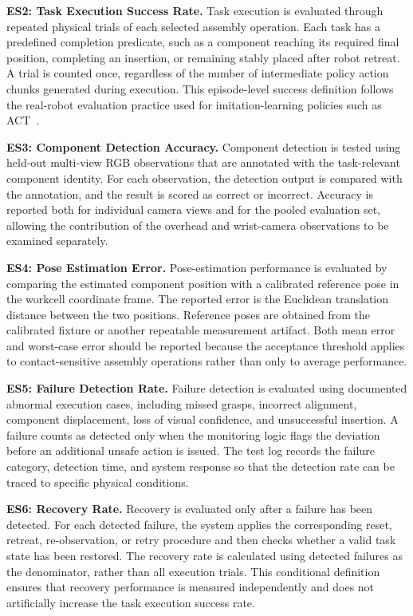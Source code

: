 \documentclass[12pt, letterpaper]{article}
\begin{document}
  \noindent\textbf{ES2: Task Execution Success Rate.}
  Task execution is evaluated through repeated physical trials of each selected
  assembly operation. Each task has a predefined completion predicate, such as a
  component reaching its required final position, completing an insertion, or
  remaining stably placed after robot retreat. A trial is counted once, regardless
  of the number of intermediate policy action chunks generated during execution.
  This episode-level success definition follows the real-robot evaluation
  practice used for imitation-learning policies such as ACT~\cite{act}.

  \noindent\textbf{ES3: Component Detection Accuracy.}
  Component detection is tested using held-out multi-view RGB observations that
  are annotated with the task-relevant component identity. For each observation,
  the detection output is compared with the annotation, and the result is scored
  as correct or incorrect. Accuracy is reported both for individual camera views
  and for the pooled evaluation set, allowing the contribution of the overhead
  and wrist-camera observations to be examined separately.

  \noindent\textbf{ES4: Pose Estimation Error.}
  Pose-estimation performance is evaluated by comparing the estimated component
  position with a calibrated reference pose in the workcell coordinate frame.
  The reported error is the Euclidean translation distance between the two
  positions. Reference poses are obtained from the calibrated fixture or another
  repeatable measurement artifact. Both mean error and worst-case error should be
  reported because the acceptance threshold applies to contact-sensitive assembly
  operations rather than only to average performance.

  \noindent\textbf{ES5: Failure Detection Rate.}
  Failure detection is evaluated using documented abnormal execution cases,
  including missed grasps, incorrect alignment, component displacement, loss of
  visual confidence, and unsuccessful insertion. A failure counts as detected
  only when the monitoring logic flags the deviation before an additional unsafe
  action is issued. The test log records the failure category, detection time,
  and system response so that the detection rate can be traced to specific
  physical conditions.

  \noindent\textbf{ES6: Recovery Rate.}
  Recovery is evaluated only after a failure has been detected. For each detected
  failure, the system applies the corresponding reset, retreat, re-observation,
  or retry procedure and then checks whether a valid task state has been
  restored. The recovery rate is calculated using detected failures as the
  denominator, rather than all execution trials. This conditional definition
  ensures that recovery performance is measured independently and does not
  artificially increase the task execution success rate.
\end{document}
